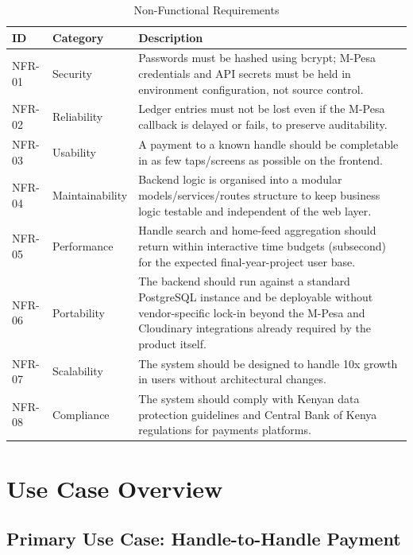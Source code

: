 \documentclass[12pt, a4paper, twoside, openright]{report}
\begin{document}
\begin{table}[H]
    \centering
    \begin{tabularx}{\textwidth}{|l|l|X|}
    \hline
    \textbf{ID} & \textbf{Category} & \textbf{Description} \\
    \hline
    NFR-01 & Security & Passwords must be hashed using bcrypt; M-Pesa credentials and API secrets must be held in environment configuration, not source control. \\
    \hline
    NFR-02 & Reliability & Ledger entries must not be lost even if the M-Pesa callback is delayed or fails, to preserve auditability. \\
    \hline
    NFR-03 & Usability & A payment to a known handle should be completable in as few taps/screens as possible on the frontend. \\
    \hline
    NFR-04 & Maintainability & Backend logic is organised into a modular models/services/routes structure to keep business logic testable and independent of the web layer. \\
    \hline
    NFR-05 & Performance & Handle search and home-feed aggregation should return within interactive time budgets (subsecond) for the expected final-year-project user base. \\
    \hline
    NFR-06 & Portability & The backend should run against a standard PostgreSQL instance and be deployable without vendor-specific lock-in beyond the M-Pesa and Cloudinary integrations already required by the product itself. \\
    \hline
    NFR-07 & Scalability & The system should be designed to handle 10x growth in users without architectural changes. \\
    \hline
    NFR-08 & Compliance & The system should comply with Kenyan data protection guidelines and Central Bank of Kenya regulations for payments platforms. \\
    \hline
    \end{tabularx}
    \caption{Non-Functional Requirements}
\end{table}

\section{Use Case Overview}

\subsection{Primary Use Case: Handle-to-Handle Payment}
\end{document}
